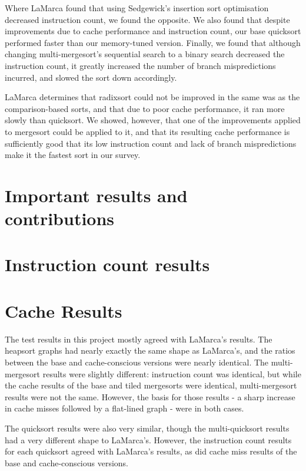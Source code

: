 Where LaMarca found that using Sedgewick's insertion sort optimisation decreased
instruction count, we found the opposite. We also found that despite
improvements due to cache performance and instruction count, our base quicksort
performed faster than our memory-tuned version. Finally, we found that although
changing multi-mergesort's sequential search to a binary search decreased the
instruction count, it greatly increased the number of branch mispredictions
incurred, and slowed the sort down accordingly.

LaMarca determines that radixsort could not be improved in the same was as the
comparison-based sorts, and that due to poor cache performance, it ran more
slowly than quicksort. We showed, however, that one of the improvements applied
to mergesort could be applied to it, and that its resulting cache performance is
sufficiently good that its low instruction count and lack of branch
mispredictions make it the fastest sort in our survey.


\section{Important results and contributions}


\section{Instruction count results}

\section{Cache Results}

The test results in this project mostly agreed with LaMarca's results.  The
heapsort graphs had nearly exactly the same shape as LaMarca's, and the ratios
between the base and cache-conscious versions were nearly identical. The
multi-mergesort results were slightly different: instruction count was
identical, but while the cache results of the base and tiled mergesorts were
identical, multi-mergesort results were not the same. However, the basis for
those results - a sharp increase in cache misses followed by a flat-lined graph
- were in both cases.

The quicksort results were also very similar, though the multi-quicksort results
had a very different shape to LaMarca's. However, the instruction count
results for each quicksort agreed with LaMarca's results, as did cache miss
results of the base and cache-conscious versions.

